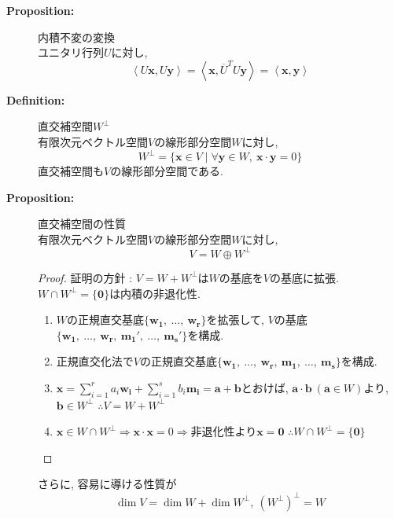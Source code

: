 \documentclass[dvipdfmx]{jsarticle}
\newcommand{\tlinner}[2]{%
    \left\langle #1, #2 \right\rangle%
}
\begin{document}
\begin{description}
    \item[\bf{Proposition:}] 内積不変の変換 \\
        ユニタリ行列$U$に対し, 
        $$ \tlinner{U\bm{x}}{U\bm{y}} = \tlinner{\bm{x}}{\overline{U}^TU\bm{y}} =\tlinner{\bm{x}}{\bm{y}} $$

    \item[\bf{Definition:}] 直交補空間$W^{\perp}$ \\
        有限次元ベクトル空間$V$の線形部分空間$W$に対し, 
        $$ W^{\perp} = \{ \bm{x} \in V \mid \forall \bm{y} \in W,\ \bm{x} \cdot \bm{y} = 0 \} $$
        直交補空間も$V$の線形部分空間である.

    \item[\bf{Proposition:}] 直交補空間の性質 \\
        有限次元ベクトル空間$V$の線形部分空間$W$に対し, 
        $$ V = W \oplus  W^{\bot} $$
        \begin{proof} 証明の方針 : $V = W + W^{\bot}$は$W$の基底を$V$の基底に拡張.$ W \cap W^{\bot} = \{ \bm{0} \}$は内積の非退化性.
            \begin{enumerate}
                \item $W$の正規直交基底$\{ \bm{w_1},\ \dots,\ \bm{w_r} \}$を拡張して, $V$の基底$\{ \bm{w_1},\ \dots,\ \bm{w_r},\ \bm{m_1}',\ \dots,\ \bm{m_s}' \}$を構成.
                \item 正規直交化法で$V$の正規直交基底$\{ \bm{w_1},\ \dots,\ \bm{w_r},\ \bm{m_1},\ \dots,\ \bm{m_s} \}$を構成.
                \item $\bm{x} = \sum_{i=1}^r a_i \bm{w_i} + \sum_{i=1}^s b_i \bm{m_i} = \bm{a} + \bm{b}$とおけば, $\bm{a} \cdot \bm{b} \ ( \bm{a} \in W)$より, $\bm{b} \in W^{\bot}$ $\therefore V = W + W^{\bot}$
                \item $ \bm{x} \in W \cap W^{\bot} \Rightarrow \bm{x} \cdot \bm{x} = 0 \Rightarrow \text{非退化性より} \bm{x} = \bm{0}$ $\therefore W \cap W^{\bot} = \{ \bm{0} \}$
            \end{enumerate}
        \end{proof}
        さらに, 容易に導ける性質が
        $$ \dim V = \dim W + \dim W^{\bot},\ (W^{\bot})^{\bot} = W $$
    
\end{description}
\end{document}
